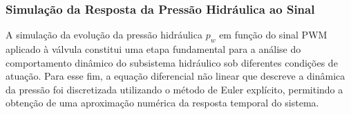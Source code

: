 \subsubsection{Simulação da Resposta da Pressão Hidráulica ao Sinal} \label{sec:controle-4-1-4-1}

A simulação da evolução da pressão hidráulica $p_w$ em função do sinal PWM aplicado à válvula constitui uma etapa fundamental para a análise do comportamento dinâmico do subsistema hidráulico sob diferentes condições de atuação. Para esse fim, a equação diferencial não linear que descreve a dinâmica da pressão foi discretizada utilizando o método de Euler explícito, permitindo a obtenção de uma aproximação numérica da resposta temporal do sistema.

